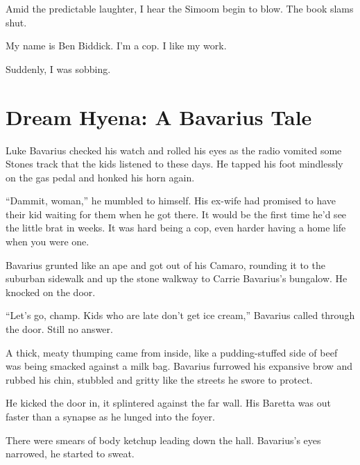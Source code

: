 Amid the predictable laughter, I hear the Simoom begin to blow. The
book slams shut.



My name is Ben Biddick. I'm a cop. I like my work.





Suddenly, I was sobbing. 
 



\chapter[Dream Hyena]{Dream Hyena: A Bavarius Tale}





Luke Bavarius checked his watch and rolled his eyes as the radio
vomited some Stones track that the kids listened to these days. He
tapped his foot mindlessly on the gas pedal and honked his horn
again.



``Dammit, woman,'' he mumbled to himself. His ex-wife had promised to
have their kid waiting for them when he got there. It would be the
first time he'd see the little brat in weeks. It was hard being a
cop, even harder having a home life when you were one.



Bavarius grunted like an ape and got out of his Camaro, rounding it
to the suburban sidewalk and up the stone walkway to Carrie
Bavarius's bungalow. He knocked on the door.



``Let's go, champ. Kids who are late don't get ice cream,'' Bavarius
called through the door. Still no answer.



A thick, meaty thumping came from inside, like a pudding-stuffed
side of beef was being smacked against a milk bag. Bavarius
furrowed his expansive brow and rubbed his chin, stubbled and
gritty like the streets he swore to protect.



He kicked the door in, it splintered against the far wall. His
Baretta was out faster than a synapse as he lunged into the
foyer.



There were smears of body ketchup leading down the hall. Bavarius's
eyes narrowed, he started to sweat.



